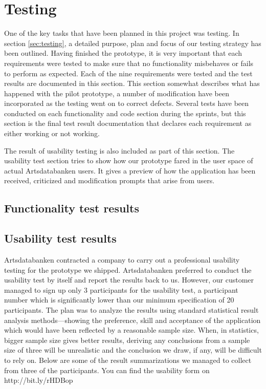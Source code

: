 \section{Testing}
\label{sec:testresult}

One of the key tasks that have been planned in this project was testing. In
section \ref{sec:testing}, a detailed purpose, plan and focus of our testing
strategy has been outlined. Having finished the prototype, it is very important
that each requirements were tested to make sure that no functionality
misbehaves or fails to perform as expected. Each of the nine requirements were
tested and the test results are documented in this section. This section
somewhat describes what has happened with the pilot prototype, a number of
modification have been incorporated as the testing went on to correct defects.
Several tests have been conducted on each functionality and code section during
the sprints, but this section is the final test result documentation that
declares each requirement as either working or not working.

The result of usability testing is also included as part of this section. The
usability test section tries to show how our prototype fared in the user space
of actual Artsdatabanken users. It gives a preview of how the application has
been received, criticized and modification prompts that arise from users.

\subsection{Functionality test results}






\subsection{Usability test results}

Artsdatabanken contracted a company to carry out a professional usability
testing for the prototype we shipped. Artsdatabanken preferred to conduct the
usability test by itself and report the results back to us. However, our
customer managed to sign up only 3 participants for the usability test, a participant number
which is significantly lower than our minimum specification of 20 participants.
The plan was to analyze the results using standard statistical result analysis
methods---showing the preference, skill and acceptance of the application which
would have been reflected by a reasonable sample size. When, in statistics,
bigger sample size gives better results\cite{statistics}, deriving any
conclusions from a sample size of three will be unrealistic and the conclusion we draw, if
any, will be difficult to rely on. Below are some of the result summarizations we managed to collect from three of the participants. You can find the usability form on http://bit.ly/rHDBop

